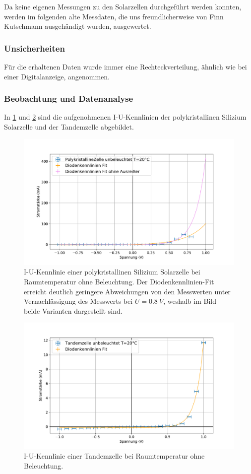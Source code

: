 \documentclass[
	a4paper,
	12pt,
	pagesize,
	ngerman
]{scrartcl}
\begin{document}
	Da keine eigenen Messungen zu den Solarzellen durchgeführt werden konnten, werden im folgenden alte Messdaten, die uns freundlicherweise von Finn Kutschmann ausgehändigt wurden, ausgewertet.
	\subsubsection{Unsicherheiten}
	Für die erhaltenen Daten wurde immer eine Rechteckverteilung, ähnlich wie bei einer Digitalanzeige, angenommen.
	\subsubsection{Beobachtung und Datenanalyse}

	In \cref{fig_poly_unbeleuchtet_20} und \cref{fig_tandem_unbeleuchtet_20} sind die aufgenohmenen I-U-Kennlinien der polykristallinen Silizium Solarzelle und der Tandemzelle abgebildet.

	\begin{figure}[H]
			\includegraphics[width=.9\linewidth]{img/PolykristallineZelle_unbeleuchtet_20.pdf}
			\caption{
				I-U-Kennlinie einer polykristallinen Silizium Solarzelle bei Raumtemperatur ohne Beleuchtung.
				Der Diodenkennlinien-Fit erreicht deutlich geringere Abweichungen von den Messwerten unter Vernachlässigung des Messwerts bei $U=\SI{0.8}{V}$, weshalb im Bild beide Varianten dargestellt sind.
								}
			\label{fig_poly_unbeleuchtet_20}
	\end{figure}

	\begin{figure}[H]
			\includegraphics[width=.9\linewidth]{img/Tandemzelle_unbeleuchtet_20.pdf}
			\caption{
				I-U-Kennlinie einer Tandemzelle bei Raumtemperatur ohne Beleuchtung.
								}
			\label{fig_tandem_unbeleuchtet_20}
	\end{figure}
\end{document}
